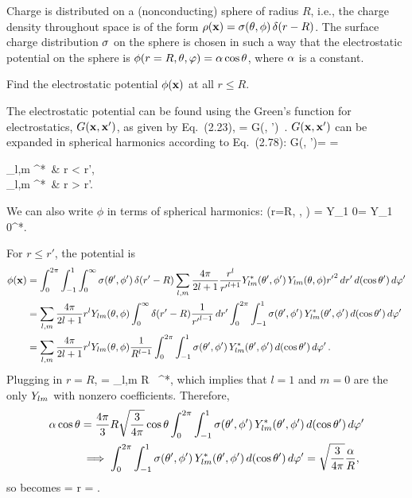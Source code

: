 \newcommand{\Gxxp}{G(\vx, \vx')}
\newcommand{\intoi}{\int_0^\infty}

\begin{statement}{}
	Charge is distributed on a (nonconducting) sphere of radius $R$, i.e., the charge density throughout space is of the form $\rho(\mathbf{x}) = \sigma(\theta, \phi) \, \delta(r - R)$.  The surface charge distribution $\sigma$ on the sphere is chosen in such a way that the electrostatic potential on the sphere is $\phi(r=R, \theta, \varphi) = \alpha \cos\theta$, where $\alpha$ is a constant.
\end{statement}

\begin{problem} \label{3a}
	Find the electrostatic potential $\phi(\mathbf{x})$ at all $r \leq R$.
\end{problem}

\begin{solution}
	The electrostatic potential can be found using the Green's function for electrostatics, $\Gxxp$, as given by Eq.~(2.23),
	\beq
		\phix = \int \Gxxp \, \rhoxp \dcxp.
	\eeq
	$\Gxxp$ can be expanded in spherical harmonics according to Eq.~(2.78):
	\beq
		\Gxxp = \frac{1}{\abs{\vx - \vx'}}
		= \begin{cases} \sum_{l,m}   \Ylm^*\tvp \, \Ylm\tv &  r < r', \\
		\sum_{l,m}   \Ylm^*\tvp \, \Ylm\tv &  r > r'. \end{cases}
	\eeq
	We can also write $\phi$ in terms of spherical harmonics:
	\beq
		\psi(r=R, \tht, \vph) = \alp {} Y_{1 0}\tv = \alp {} Y_{1 0}^*\tv.
	\eeq
	
	For $r \leq r'$, the potential is
	\begin{align}
		\phix &= \intotp \intono \intoi \sig\tvp \, \delta(r' - R) \sum_{l,m} \frac{4\pi}{2l + 1} \frac{r^l}{{r'}^{l + 1}} \Ylm^*\tvp \, \Ylm\tv {r'}^2 \drp \dctp \dvp \notag \\
		&= \sum_{l,m} \frac{4\pi}{2l + 1} r^l \Ylm\tv \intoi \delta(r' - R) \frac{1}{{r'}^{l - 1}} \drp \intotp \intono \sig\tvp \, \Ylm^*\tvp \dctp \dvp \notag \\
		&= \sum_{l,m} \frac{4\pi}{2l + 1} r^l \Ylm\tv \frac{1}{R^{l - 1}} \intotp \intono \sig\tvp \, \Ylm^*\tvp \dctp \dvp. \label{pot1ax}
	\end{align}
	Plugging in $r = R$,
	\beq
		\alp \cost = \sum_{l,m}  R \Ylm\tv \intotp \intono \sig\tvp \, \Ylm^*\tvp \dctp \dvp,
	\eeq
	which implies that $l = 1$ and $m = 0$ are the only $Y_{l m}$ with nonzero coefficients.  Therefore,
	\begin{align}
		\alpha \cos\theta &= \frac{4\pi}{3} R \sqrt{\frac{3}{4\pi}} \cos\theta \int_0^{2\pi} \int_{-1}^1 \sigma(\theta', \phi') \, Y_{l m}^*(\theta', \phi') \dd{(\cos\theta')} \dd{\varphi'} \notag \\
		&\implies \int_0^{2\pi} \int_{-1}^1 \sigma(\theta', \phi') \, Y_{l m}^*(\theta', \phi') \dd{(\cos\theta')} \dd{\varphi'} = \sqrt{\frac{3}{4\pi}} \frac{\alpha}{R}, \label{integ}
	\end{align}
	so  becomes
	\beq
		\phix =  r  \cost {}  
		= \alp {} \cost.
	\eeq
\end{solution}
\vfix



